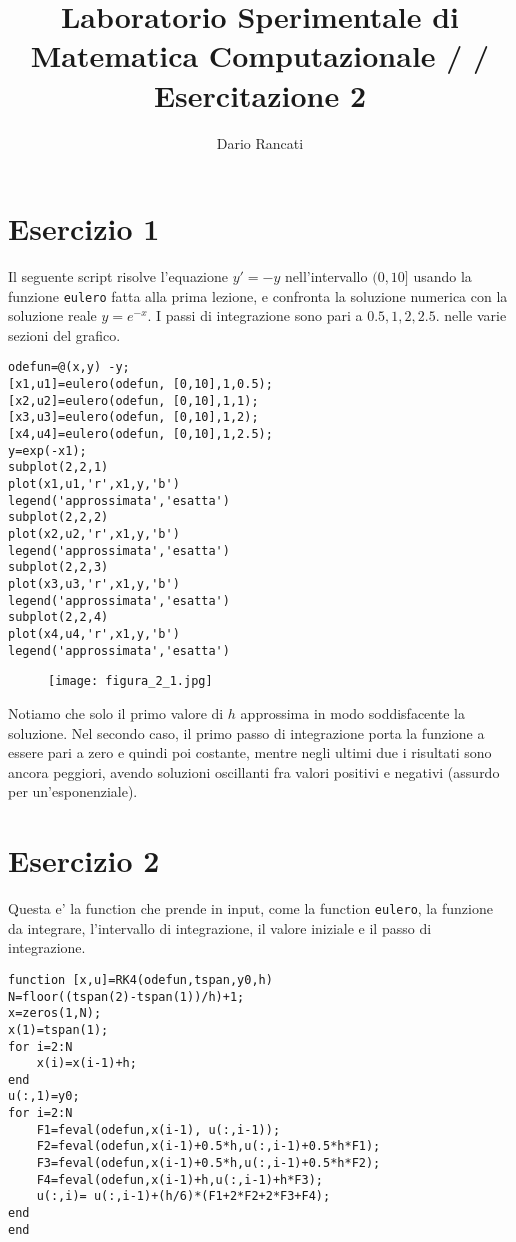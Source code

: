 \documentclass{article}
\title{\textbf{Laboratorio Sperimentale di Matematica Computazionale / / Esercitazione 2}}
\author{Dario Rancati}
\begin{document}
\section*{Esercizio 1}

Il seguente script risolve l'equazione $y'=-y$ nell'intervallo $(0,10]$ usando la funzione \texttt{eulero} fatta alla prima lezione, e confronta la soluzione numerica con la soluzione reale $y=e^{-x}$. I passi di integrazione sono pari a $0.5,1,2,2.5.$ nelle varie sezioni del grafico.

\begin{lstlisting}[style=Matlab-editor]
odefun=@(x,y) -y;
[x1,u1]=eulero(odefun, [0,10],1,0.5);
[x2,u2]=eulero(odefun, [0,10],1,1);
[x3,u3]=eulero(odefun, [0,10],1,2);
[x4,u4]=eulero(odefun, [0,10],1,2.5);
y=exp(-x1);
subplot(2,2,1) 
plot(x1,u1,'r',x1,y,'b') 
legend('approssimata','esatta')
subplot(2,2,2) 
plot(x2,u2,'r',x1,y,'b')
legend('approssimata','esatta')
subplot(2,2,3) 
plot(x3,u3,'r',x1,y,'b')
legend('approssimata','esatta')
subplot(2,2,4) 
plot(x4,u4,'r',x1,y,'b')
legend('approssimata','esatta')
\end{lstlisting}

\begin{figure}[!h]
\centering
\texttt{[image: figura\_2\_1.jpg]}
\end{figure}

\noindent
Notiamo che solo il primo valore di $h$ approssima in modo soddisfacente la soluzione. Nel secondo caso, il primo passo di integrazione porta la funzione a essere pari a zero e quindi poi costante, mentre negli ultimi due i risultati sono ancora peggiori, avendo soluzioni oscillanti fra valori positivi e negativi (assurdo per un'esponenziale).

\section*{Esercizio 2}

Questa e' la function che prende in input, come la function \texttt{eulero}, la funzione da integrare, l'intervallo di integrazione, il valore iniziale e il passo di integrazione.

\begin{lstlisting}[style=Matlab-editor]
function [x,u]=RK4(odefun,tspan,y0,h)
N=floor((tspan(2)-tspan(1))/h)+1;
x=zeros(1,N);
x(1)=tspan(1);
for i=2:N
    x(i)=x(i-1)+h;
end
u(:,1)=y0;
for i=2:N
    F1=feval(odefun,x(i-1), u(:,i-1));
    F2=feval(odefun,x(i-1)+0.5*h,u(:,i-1)+0.5*h*F1);
    F3=feval(odefun,x(i-1)+0.5*h,u(:,i-1)+0.5*h*F2);
    F4=feval(odefun,x(i-1)+h,u(:,i-1)+h*F3);
    u(:,i)= u(:,i-1)+(h/6)*(F1+2*F2+2*F3+F4);
end
end
\end{lstlisting}
\end{document}
